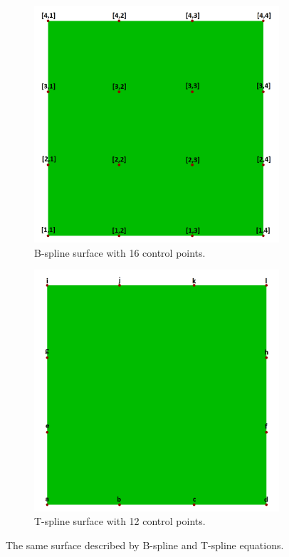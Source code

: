 \documentclass{article}
\begin{document}
\begin{figure}[H]
\centering
\begin{subfigure}[b]{0.48\textwidth}
\includegraphics[width=\textwidth]{splinegrid1}
\caption{B-spline surface with 16 control points.}
\label{splinegrid2}
\end{subfigure}
\begin{subfigure}[b]{0.48\textwidth}
\includegraphics[width=\textwidth]{splinegrid2}
\caption{T-spline surface with 12 control points.}
\label{splinegrid2}
\end{subfigure}
\caption{The same surface described by B-spline and T-spline equations.}
\label{surfacegrids}
\end{figure}
\end{document}
